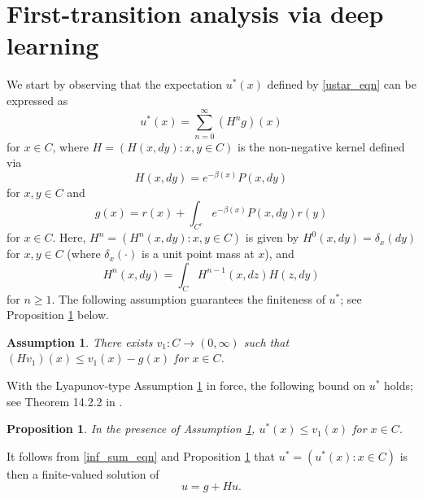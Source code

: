 \documentclass[pdflatex,sn-mathphys-ay]{sn-jnl}%
\numberwithin{equation}{section}
\theoremstyle{thmstyleone}%
\newtheorem{proposition}[theorem]{Proposition}%
\theoremstyle{thmstyletwo}%
\theoremstyle{thmstylethree}%
\newtheorem{assumption}{Assumption}
\begin{document}
\section{First-transition analysis via deep learning}
\label{first_section}
We start by observing that the expectation $u^*(x)$ defined by \eqref{ustar_eqn} can be expressed as 
\begin{equation}
\label{inf_sum_eqn}
u^*(x)=\sum_{n=0}^\infty (H^ng)(x)
\end{equation}
for $x\in C$, where $H=(H(x,dy):x,y\in C)$ is the non-negative kernel defined via
\[
H(x,dy)=e^{-\beta(x)}P(x,dy)
\]
for $x,y\in C$ and 
\[
g(x)=r(x)+\int_{C^c}e^{-\beta(x)}P(x,dy)r(y)
\]
for $x\in C$. Here, $H^n=(H^n(x,dy):x,y\in C)$ is given by $H^0(x,dy)=\delta_x(dy)$ for $x,y\in C$ (where $\delta_x(\cdot)$ is a unit point mass at $x$), and
\[
H^n(x,dy)=\int_C H^{n-1}(x,dz)H(z,dy)
\]
for $n\geq1$.
The following assumption guarantees the finiteness of $u^*$; see Proposition \ref{finiteness_proposition} below.
\begin{assumption}
\label{finiteness_assumption}
There exists $v_1:C\rightarrow(0,\infty)$ such that $(Hv_1)(x)\leq v_1(x)-g(x)$ for $x\in C$.
\end{assumption}
With the Lyapunov-type Assumption \ref{finiteness_assumption} in force, the following bound on $u^*$ holds; see Theorem 14.2.2 in \cite{meyn2012markov}.
\begin{proposition}
\label{finiteness_proposition}
In the presence of Assumption \ref{finiteness_assumption}, $u^*(x)\leq v_1(x)$ for $x\in C$.
\end{proposition}
It follows from \eqref{inf_sum_eqn} and Proposition \ref{finiteness_proposition} that $u^*=(u^*(x):x\in C)$ is then a finite-valued solution of 
\begin{equation}
\label{FTA_eqn}
    u=g+Hu.
\end{equation}
\end{document}
